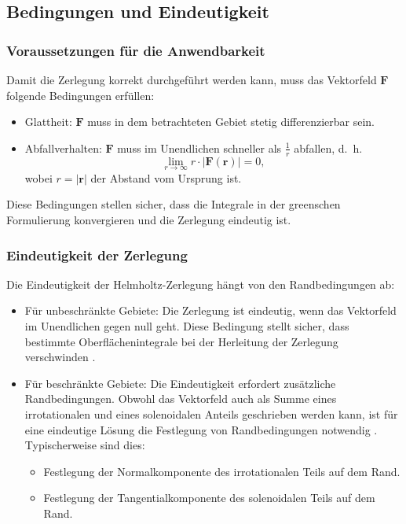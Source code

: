 \subsection{Bedingungen und Eindeutigkeit
\label{helmholtz:subsection:Bedingungen_Eindeutigkeit}}

\subsubsection{Voraussetzungen für die Anwendbarkeit}
Damit die Zerlegung korrekt durchgeführt werden kann, muss das
Vektorfeld $\boldsymbol{F}$ folgende Bedingungen erfüllen:

\begin{itemize}
\item Glattheit: $\boldsymbol{F}$ muss in dem betrachteten Gebiet
stetig differenzierbar sein.
\item Abfallverhalten: $\boldsymbol{F}$ muss im Unendlichen schneller
als $\frac{1}{r}$ abfallen, d.~h.
\begin{equation*}
\lim_{r \to \infty} r\cdot |\boldsymbol{F}(\boldsymbol{r})| = 0,
\end{equation*}
wobei $r = |\boldsymbol{r}|$ der Abstand vom Ursprung ist.
\end{itemize}
Diese Bedingungen stellen sicher, dass die Integrale in der greenschen
Formulierung konvergieren und die Zerlegung eindeutig ist.

\subsubsection{Eindeutigkeit der Zerlegung
\label{helmholtz:subsection:Bedingungen_onlyEindeutigkeit}}

Die Eindeutigkeit der Helmholtz-Zerlegung hängt von den Randbedingungen ab:
%

\begin{itemize}
\item Für unbeschränkte Gebiete: Die Zerlegung ist eindeutig, wenn
das Vektorfeld im Unendlichen gegen null geht.
Diese Bedingung stellt sicher, dass bestimmte Oberflächenintegrale
bei der Herleitung der Zerlegung verschwinden \cite{wiki:helmholtz}.

\item
Für beschränkte Gebiete: Die Eindeutigkeit erfordert zusätzliche
Randbedingungen.
Obwohl das Vektorfeld auch als Summe eines irrotationalen und eines
solenoidalen Anteils geschrieben werden kann, ist für eine eindeutige
Lösung die Festlegung von Randbedingungen notwendig \cite{wiki:helmholtz}.
Typischerweise sind dies:
  \begin{itemize}
    \item Festlegung der Normalkomponente des irrotationalen Teils
    auf dem Rand.
    \item Festlegung der Tangentialkomponente des solenoidalen Teils
    auf dem Rand.
  \end{itemize}
\end{itemize}

